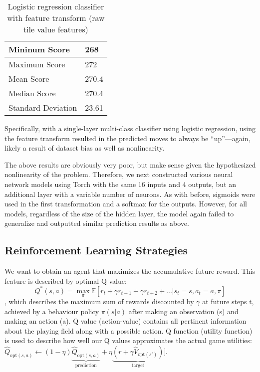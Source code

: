 \documentclass[9pt,twocolumn]{article}
\begin{document}
\begin{table}[!htbp]

\centering

\begin{tabular}{|l|l|}
\hline
Mininum Score      & 268 \\ \hline
Maximum Score      & 272 \\ \hline
Mean Score         & 270.4 \\ \hline
Median Score       & 270.4 \\ \hline
Standard Deviation & 23.61 \\ \hline
\end{tabular}

\caption{Logistic regression classifier with feature transform (raw tile value features)}

\end{table}

Specifically, with a single-layer multi-class classifier using logistic regression, using the feature transform resulted in the predicted moves to always be “up”—again, likely a result of dataset bias as well as nonlinearity. 

The above results are obviously very poor, but make sense given the hypothesized nonlinearity of the problem. Therefore, we next constructed various neural network models using Torch with the same 16 inputs and 4 outputs, but an additional layer with a variable number of neurons. As with before, sigmoids were used in the first transformation and a softmax for the outputs. However, for all models, regardless of the size of the hidden layer, the model again failed to generalize and outputted similar prediction results as above. 

\subsection{Reinforcement Learning Strategies}

We want to obtain an agent that maximizes the accumulative future reward. This feature is described by optimal Q value: $$Q^*(s, a) = \max_{\pi} \mathbb{E} [r_t + \gamma r_{t + 1} + \gamma r_{t + 2} + \dots | s_t = s, a_t = a, \pi]$$, which describes the maximum sum of rewards discounted by $\gamma$ at future steps t, achieved by a behaviour policy $\pi(s|a)$ after making an observation (s) and making an action (a). Q value (action-value) contains all pertinent information about the playing field along with a possible action. Q function (utility function) is used to describe how well our Q values approximates the actual game utilities: $\hat Q_{\text{opt}(s, a)} \leftarrow (1-\eta) \underbrace{\hat Q_{\text{opt}(s, a)}}_\text{prediction} + \eta \underbrace{(r + \gamma \hat V_{\text{opt}(s')})}_\text{target}]$. 
\end{document}
